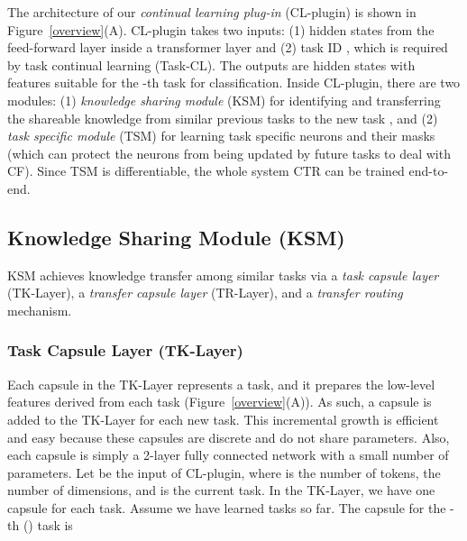 \documentclass{article}
\begin{document}
The architecture of our \textit{continual learning plug-in} (CL-plugin) is shown in Figure~\ref{overview}(A). CL-plugin takes two inputs: (1) hidden states  from the feed-forward layer inside a transformer layer and (2) task ID , which is required by task continual learning (Task-CL).
The outputs are hidden states with features suitable for the -th task for classification. Inside CL-plugin, there are two modules: (1) \textit{knowledge sharing module} (KSM) for identifying and transferring the shareable knowledge from similar previous tasks to the new task , and (2) \textit{task specific module} (TSM) for learning task specific neurons and their masks (which can protect the neurons from being updated by future tasks to deal with CF). Since TSM is differentiable, the {whole system CTR can be trained end-to-end.} 




















\subsection{Knowledge Sharing Module (KSM)}
\label{sec:task_sharing}
\vspace{-0.5mm}







KSM achieves knowledge transfer among similar tasks via a \textit{task capsule layer} (TK-Layer), a \textit{transfer capsule layer} (TR-Layer), and a \textit{transfer routing} mechanism.





\subsubsection{Task Capsule Layer (TK-Layer)} Each capsule in the TK-Layer represents a task, and it prepares the low-level features derived from each task (Figure~\ref{overview}(A)). As such, a capsule is added to the TK-Layer for each new task. This incremental growth is efficient and easy because these capsules are discrete and do not share parameters.
Also, each capsule is simply a 2-layer fully connected network with a small number of parameters. Let  be the input of CL-plugin, where  is the number of tokens,  the number of dimensions, and  is the current task. In the TK-Layer, we have one capsule for each task. Assume we have learned  tasks so far. The capsule for the -th () task is
\end{document}
